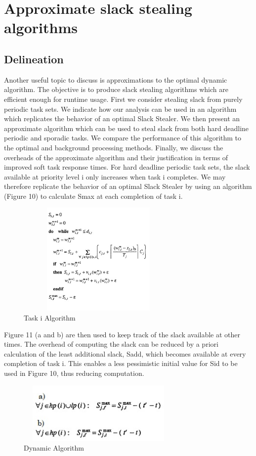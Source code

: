 \documentclass[conference]{IEEEtran}
\begin{document}
\section{Approximate slack stealing algorithms}
\subsection{Delineation}
Another useful topic to discuss is approximations to the optimal
dynamic algorithm. The objective is to produce slack
stealing algorithms which are efficient enough for runtime usage. First we consider stealing slack from purely
periodic task sets. We indicate how our analysis can be
used in an algorithm which replicates the behavior of an
optimal Slack Stealer. We
then present an approximate algorithm which can be used
to steal slack from both hard deadline periodic and
sporadic tasks. We compare the performance of this
algorithm to the optimal and background processing
methods. Finally, we discuss the overheads of the
approximate algorithm and their justification in terms of
improved soft task response times.
For hard deadline periodic task sets, the slack available
at priority level i only increases when task i completes.
We may therefore replicate the behavior of an optimal Slack
Stealer by using an algorithm (Figure 10) to calculate Smax at each completion of task i.
\begin{figure}[h!]
	\includegraphics[width=8cm, height=5.5cm]{alg3}
	\caption{Task i Algorithm}
	\centering
\end{figure}
Figure 11 (a and b) are then used to keep track of the
slack available at other times. The overhead of computing
the slack can be reduced by a priori calculation of the
least additional slack, Sadd, which becomes available at
every completion of task i. This enables a less pessimistic
initial value for Sid to be used in Figure 10, thus
reducing computation.
\begin{figure}[h!]
	\includegraphics[width=8cm, height=3cm]{alg4}
	\caption{Dynamic Algorithm}
	\centering
\end{figure}
\end{document}

